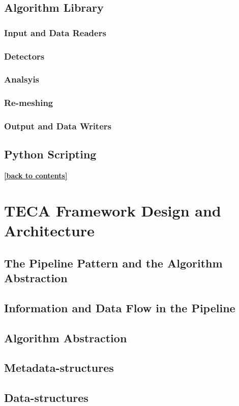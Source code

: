 \documentclass[a4paper,10pt,DIV=12]{scrreprt}
\begin{document}
\section{Algorithm Library}
\subsection{Input and Data Readers}
\subsection{Detectors}
\subsection{Analsyis}
\subsection{Re-meshing}
\subsection{Output and Data Writers}
\section{Python Scripting}
\hyperlink{toc}{\footnotesize \bf [back to contents]}

\chapter{TECA Framework Design and Architecture}
\section{The Pipeline Pattern and the Algorithm Abstraction}
\section{Information and Data Flow in the Pipeline}
\section{Algorithm Abstraction}
\section{Metadata-structures}
\section{Data-structures}
\end{document}
